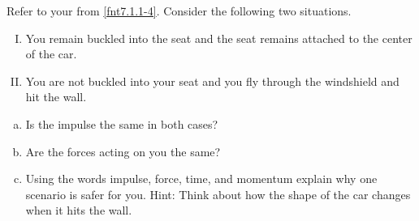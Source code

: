 \label{fnt7.1.1-6}


Refer to your \pcharts{} from \ref{fnt7.1.1-4}. Consider the following two situations.

\begin{enumerate}[I.]
	\item You remain buckled into the seat and the seat remains attached to the center of the car.
	\item You are not buckled into your seat and you fly through the windshield and hit the wall.
\end{enumerate}

\begin{enumerate}[(a)]
	\item Is the impulse the same in both cases?
	\item Are the forces acting on you the same?
	\item Using the words impulse, force, time, and momentum explain why one scenario is safer for you.  Hint: Think about how the shape of the car changes when it hits the wall.
\end{enumerate}